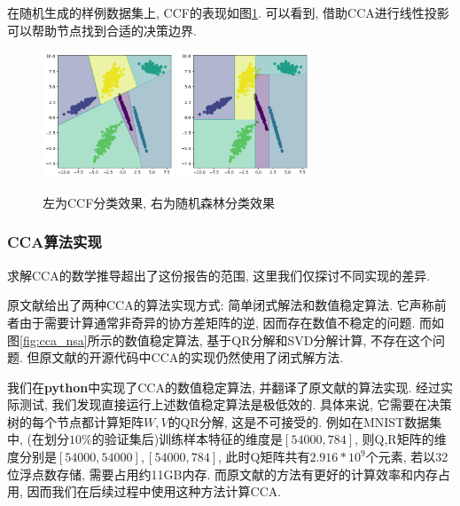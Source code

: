 \documentclass[a4paper]{article}
\begin{document}
在随机生成的样例数据集上, CCF的表现如图\ref{fig:dtest_ccf}. 可以看到, 借助CCA进行线性投影可以帮助节点找到合适的决策边界.
\begin{figure}[h]
    \centering
    \includegraphics[width=0.35\textwidth,height=0.35\textwidth]{figs/8.png}
    \includegraphics[width=0.35\textwidth,height=0.35\textwidth]{figs/9.png}
    \caption{左为CCF分类效果, 右为随机森林分类效果}
    \label{fig:dtest_ccf}
\end{figure}

\subsubsection{CCA算法实现}
求解CCA的数学推导超出了这份报告的范围, 这里我们仅探讨不同实现的差异.

原文献\cite{ccf}给出了两种CCA的算法实现方式: 简单闭式解法和数值稳定算法. 它声称前者由于需要计算通常非奇异的协方差矩阵的逆, 因而存在数值不稳定的问题. 而如图\ref{fig:cca_nsa}所示的数值稳定算法, 基于QR分解和SVD分解计算, 不存在这个问题. 但原文献的开源代码中CCA的实现仍然使用了闭式解方法. 

我们在\textbf{python}中实现了CCA的数值稳定算法, 并翻译了原文献的算法实现. 经过实际测试, 我们发现直接运行上述数值稳定算法是极低效的. 具体来说, 它需要在决策树的每个节点都计算矩阵$W,V$的QR分解, 这是不可接受的. 例如在MNIST数据集中, (在划分$10\%$的验证集后)训练样本特征的维度是$[54000,784]$, 则Q,R矩阵的维度分别是$[54000,54000],[54000,784]$, 此时Q矩阵共有$2.916*10^{9}$个元素, 若以32位浮点数存储, 需要占用约11GB内存. 而原文献的方法有更好的计算效率和内存占用,  因而我们在后续过程中使用这种方法计算CCA.
\end{document}
